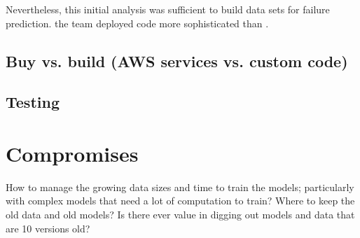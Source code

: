 
Nevertheless, this initial analysis was sufficient to build data sets for failure prediction.  the team deployed code more sophisticated than .

\subsection{Buy vs. build (AWS services vs. custom code)}


\subsection{Testing}

\section{Compromises}
How to manage the growing data sizes and time to train the models; particularly with complex models that need a lot of computation to train? Where to keep the old data and old models? Is there ever value in digging out models and data that are 10 versions old?

\printbibliography


